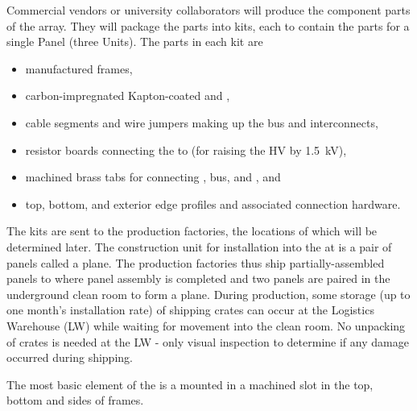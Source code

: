 Commercial vendors or university collaborators will produce the component parts of the  array. 
They will package the parts into kits, each to contain the parts for a single  Panel (three  Units). The parts in each kit are 
\begin{itemize}
\item manufactured \frfour {} frames, %
\item carbon-impregnated Kapton-coated  and ,
\item {} cable segments and wire jumpers making up the   bus and  interconnects,
\item resistor boards connecting the  to  (for raising the  HV by \SI{1.5}{\kV}),
\item machined brass tabs for connecting ,  bus, and , and
\item top, bottom, and exterior edge profiles and associated connection hardware.
\end{itemize}
The kits are sent to the production factories, the locations of which will be determined later.  
The %
 construction unit for installation into the  at \surf is a pair of  panels called a  plane. The production factories thus ship partially-assembled  panels to \surf where panel assembly is completed and two panels are paired in the underground clean room to form a  plane. During production, some storage (up to one month's installation rate) of  shipping crates can occur at the Logistics Warehouse (LW) while waiting for movement into the \surf clean room.  No unpacking of crates is needed at the LW - only visual inspection to determine if any damage occurred during shipping.

The most basic element of the  
is a  mounted in a machined slot in the top, bottom and sides of \frfour frames.  



